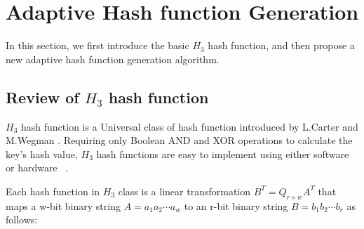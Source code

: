 \documentclass[10pt,journal,letterpaper]{IEEEtran}
\newcommand{\note}[1]{{\sffamily\itshape\bfseries\uline{#1}}}
\begin{document}
%
%



\section{Adaptive Hash function Generation}
\label{sec:Adaptive Hash function Generation}
In this section,
we first  introduce the basic $H_3$ hash function, and then propose a new adaptive hash function generation algorithm.


\subsection{Review of $H_3$ hash function}
\label{subsec:The review of $H_3$ hash function}
$H_3$ hash function is a Universal class of hash function introduced by L.Carter and M.Wegman \cite{carter1979universal}.
 Requiring only Boolean AND and XOR operations to calculate the key's hash value, $H_3$ hash functions are easy to implement using either software or hardware ~\cite{ramakrishna1997efficient,ramakrishna1991perfect}.

Each hash function in $H_3$ class is a linear transformation ${B^T} = {Q_{r \times w}}{A^T}$ that maps a w-bit binary string $A = {a_1}{a_2} \cdots {a_w}$ to an r-bit binary string $B = {b_1}{b_2} \cdots {b_r}$ as follows:
\end{document}
